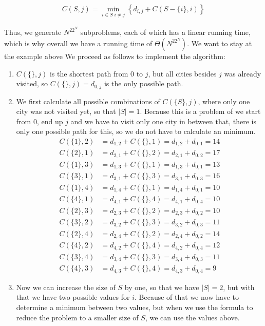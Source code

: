 \begin{align}
    C(S,j)=\min_{i\in S\;i\neq j}\left\{d_{i,j}+C(S-\{i\},i)\right\}
\end{align}

Thus, we generate $N^22^N$ subproblems, each of which has a linear running time, which is why overall we have a running time of $\Theta(N^22^N)$. We want to stay at the example above We proceed as follows to implement the algorithm:

\begin{enumerate}
    \item $C(\{\},j)$ is the shortest path from $0$ to $j$, but all cities besides $j$ was already visited, so $C(\{\},j)=d_{0,j}$ is the only possible path.
    \item We first calculate all possible combinations of $C(\{S\},j)$, where only one city was not visited yet, so that $|S|=1$. Because this is a problem of we start from 0, end up $j$ and we have to visit only one city in between that, there is only one possible path for this, so we do not have to calculate an minimum.
    \begin{align*}
        C(\{1\},2)&=d_{1,2}+C(\{\},1)=d_{1,2}+d_{0,1}=14\\
        C(\{2\},1)&=d_{2,1}+C(\{\},2)=d_{2,1}+d_{0,2}=17\\
        C(\{1\},3)&=d_{1,3}+C(\{\},1)=d_{1,3}+d_{0,1}=13\\
        C(\{3\},1)&=d_{3,1}+C(\{\},3)=d_{3,1}+d_{0,3}=16\\
        C(\{1\},4)&=d_{1,4}+C(\{\},1)=d_{1,4}+d_{0,1}=10\\
        C(\{4\},1)&=d_{4,1}+C(\{\},4)=d_{4,1}+d_{0,4}=10\\
        C(\{2\},3)&=d_{2,3}+C(\{\},2)=d_{2,3}+d_{0,2}=10\\
        C(\{3\},2)&=d_{3,2}+C(\{\},3)=d_{3,2}+d_{0,3}=11\\
        C(\{2\},4)&=d_{2,4}+C(\{\},2)=d_{2,4}+d_{0,2}=14\\
        C(\{4\},2)&=d_{4,2}+C(\{\},4)=d_{4,2}+d_{0,4}=12\\
        C(\{3\},4)&=d_{3,4}+C(\{\},3)=d_{3,4}+d_{0,3}=11\\
        C(\{4\},3)&=d_{4,3}+C(\{\},4)=d_{4,3}+d_{0,4}=9
    \end{align*}
    \item Now we can increase the size of $S$ by one, so that we have $|S|=2$, but with that we have two possible values for $i$. Because of that we now have to determine a minimum between two values, but when we use the formula to reduce the problem to a smaller size of $S$, we can use the values above.

\end{enumerate}
